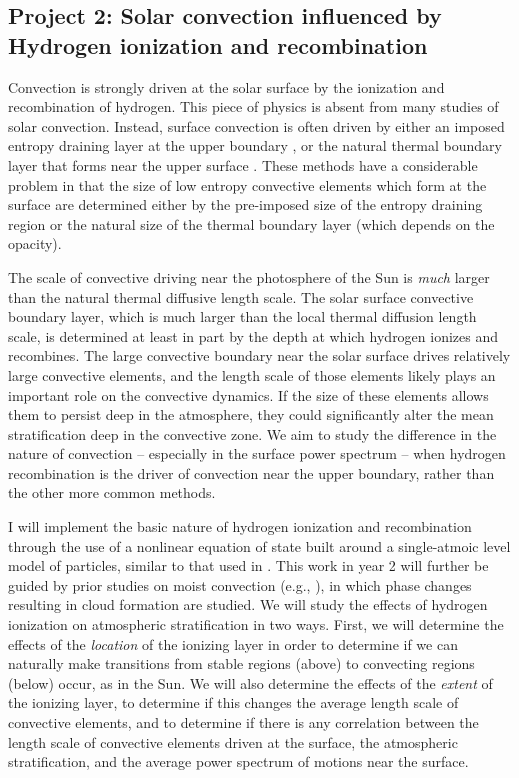 \documentclass[aasms,12pt]{article}
\begin{document}
\subsection{Project 2: Solar convection influenced by Hydrogen ionization and recombination}
Convection is strongly driven at the solar surface by the ionization and recombination of hydrogen.
This piece of physics is absent from many studies of solar convection. Instead, surface convection
is often driven by either an imposed entropy draining layer at the upper boundary \citep{kapyla&all2017}, 
or the natural thermal boundary layer that forms near the upper surface \citep{anders&brown2017}.
These methods have a considerable problem in that the size of low entropy
convective elements which form at the surface are determined either by the pre-imposed size of the
entropy draining region or the natural size of the thermal boundary layer (which depends on
the opacity).

The scale of convective driving near the photosphere of the Sun is \emph{much} larger than the
natural thermal diffusive length scale. The solar surface convective boundary layer, which is
much larger than the local thermal diffusion length scale, is
determined at least in part by the depth at which hydrogen ionizes and recombines.
The large convective boundary near the solar surface drives relatively large convective elements,
and the length scale of those elements likely plays an important role on the convective dynamics. 
If the size of these elements allows them to persist deep in the atmosphere, they could significantly alter the
mean stratification deep in the convective zone.  We aim to study the difference in the 
nature of convection -- especially in the surface power spectrum -- when hydrogen recombination
is the driver of convection near the upper boundary, rather than the other more common methods.

I will implement the basic nature of hydrogen ionization and recombination through the use of
a nonlinear equation of state built around a single-atmoic level model of particles,
similar to that used in \cite{rast&toomre1993}.
This work in year 2 will further be guided by prior studies on moist convection (e.g., \citet{leconte&all2017}),
in which phase changes resulting in cloud formation are studied. We will study the effects of
hydrogen ionization on atmospheric stratification in two ways.  First, we will determine the effects of the
\emph{location} of the ionizing layer in order to determine if we can naturally make transitions from
stable regions (above) to convecting regions (below) occur, as in the Sun.  We will also determine
the effects of the \emph{extent} of the ionizing layer, to determine if this changes the average length
scale of convective elements, and to determine if there is any correlation between the length scale of convective
elements driven at the surface, the atmospheric stratification, and the average power spectrum of motions near the
surface.
\end{document}
